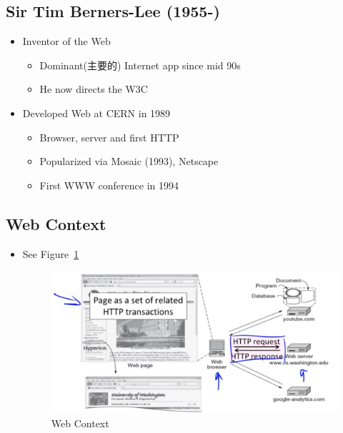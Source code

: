 \documentclass[12pt]{ctexart}   %
\begin{document}
	\subsection{Sir Tim Berners-Lee (1955-)}
	\begin{itemize}
		\item Inventor of the Web
		\begin{itemize}
			\item Dominant(主要的) Internet app since mid 90s
			\item He now directs the W3C
		\end{itemize}
		
		\item Developed Web at CERN in 1989
		\begin{itemize}
			\item Browser, server and first HTTP
			\item Popularized via Mosaic (1993), Netscape
			\item First WWW conference in 1994
		\end{itemize}
	\end{itemize}
	
	\subsection{Web Context}
	\begin{itemize}
		\item See Figure~\ref{fig:8-4-2}
		  
		 \begin{figure}[h!] %
		\centering
		 \includegraphics[scale=0.7]{images/8-4-2}
		\caption{ Web Context }
		 \label{fig:8-4-2}
		 \end{figure}
	\end{itemize}
	
\end{document}
